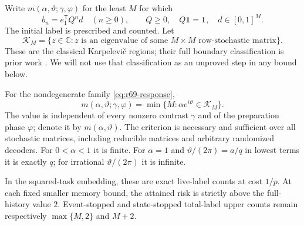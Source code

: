 Write $m(\alpha,\vartheta;\gamma,\varphi)$ for the least $M$ for which
\[
 b_n=e_1^{\mathsf T}Q^nd\quad(n\ge0),\qquad
 Q\ge0,\quad Q\mathbf1=\mathbf1,\quad d\in[0,1]^M.
\]
The initial label is prescribed and counted. Let
\[
 \mathcal K_M=\{z\in\mathbb C:z\text{ is an eigenvalue of some }
                         M\times M\text{ row-stochastic matrix}\}.
\]
These are the classical Karpelevi\v c regions; their full boundary classification is prior work \cite{JohnsonPaparella17}. We will not use that classification as an unproved step in any bound below.

\begin{theorem}\label{thm:r69-spectral}
For the nondegenerate family \eqref{eq:r69-response},
\begin{equation}\label{eq:r69-minimal}
 m(\alpha,\vartheta;\gamma,\varphi)
       =\min\{M:\alpha e^{i\vartheta}\in\mathcal K_M\}.
\end{equation}
The value is independent of every nonzero contrast $\gamma$ and of the preparation phase $\varphi$; denote it by $m(\alpha,\vartheta)$. The criterion is necessary and sufficient over all stochastic matrices, including reducible matrices and arbitrary randomized decoders. For $0<\alpha<1$ it is finite. For $\alpha=1$ and $\vartheta/(2\pi)=a/q$ in lowest terms it is exactly $q$; for irrational $\vartheta/(2\pi)$ it is infinite.

In the squared-task embedding, these are exact live-label counts at cost $1/p$. At each fixed smaller memory bound, the attained risk is strictly above the full-history value $2$. Event-stopped and state-stopped total-label upper counts remain respectively $\max\{M,2\}$ and $M+2$.
\end{theorem}
